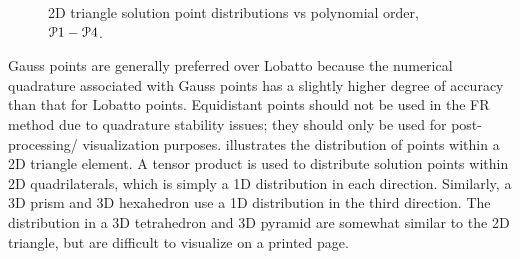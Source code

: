 \begin{figure}
  \begin{centering}
    \begin{subfigure}{1.5in}
      \caption{\PO[1]}
      \label{FIG:Triangle_Gauss_P1}
    \end{subfigure}%
    \begin{subfigure}{1.5in}
      \caption{\PO[2]}
      \label{FIG:Triangle_Gauss_P2}
    \end{subfigure}%
    \begin{subfigure}{1.5in}
      \caption{\PO[3]}
      \label{FIG:Triangle_Gauss_P3}
    \end{subfigure}
    \begin{subfigure}{1.5in}
      \caption{\PO[4]}
      \label{FIG:Triangle_Gauss_P4}
    \end{subfigure}
    \caption{2D triangle  solution point distributions vs
             polynomial order, $\PO[1]-\PO[4]$.}
    \label{FIG:2D_Triangle_GaussPoints}
  \end{centering}
\end{figure}


Gauss points are generally preferred over Lobatto because the numerical
quadrature associated with Gauss points has a slightly higher degree of
accuracy than that for Lobatto points.
%
Equidistant points should not be used in the FR method due to quadrature
stability issues; they should only be used for post-processing\slash
visualization purposes.
%
 illustrates the distribution of
 points within a 2D triangle element.
%
A tensor product is used to distribute solution points within 2D quadrilaterals,
which is simply a 1D distribution in each direction.
%
Similarly, a 3D prism and 3D hexahedron use a 1D distribution in the
third direction.
%
The distribution in a 3D tetrahedron and 3D pyramid are somewhat similar
to the 2D triangle, but are difficult to visualize on a printed page.


